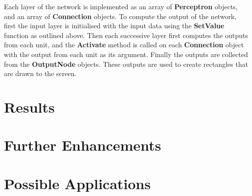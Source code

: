 \documentclass{acm_proc_article-sp}
\begin{document}
\vspace{3mm}

Each layer of the network is implemented as an array of \textbf{Perceptron} objects, and an array of \textbf{Connection} objects. To compute the output of the network, first the input layer is initialised with the input data using the \textbf{SetValue} function as outlined above. Then each successive layer first computes the outputs from each unit, and the \textbf{Activate} method is called on each \textbf{Connection} object with the output from each unit as its argument. Finally the outputs are collected from the \textbf{OutputNode} objects. These outputs are used to create rectangles that are drawn to the screen. 

\section{Results}
\label{sec:results}



\section{Further Enhancements}
\label{sec:enhance}

\section{Possible Applications}
\label{sec:appl}


\end{document}
